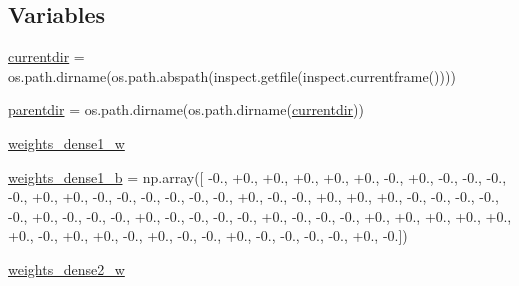 \subsection*{Variables}
\begin{DoxyCompactItemize}
\item 
\hyperlink{namespacepybullet-gym_1_1pybulletgym_1_1examples_1_1roboschool-weights_1_1enjoy___t_f___inverted4815cf8a7bea8454ae92c5ac92dac9b4_a56e49ade808215d29e9f40f047cbbf3e}{currentdir} = os.\+path.\+dirname(os.\+path.\+abspath(inspect.\+getfile(inspect.\+currentframe())))
\item 
\hyperlink{namespacepybullet-gym_1_1pybulletgym_1_1examples_1_1roboschool-weights_1_1enjoy___t_f___inverted4815cf8a7bea8454ae92c5ac92dac9b4_ace85bf3ab97ceff6b21af22abff501fa}{parentdir} = os.\+path.\+dirname(os.\+path.\+dirname(\hyperlink{namespacepybullet-gym_1_1pybulletgym_1_1examples_1_1roboschool-weights_1_1enjoy___t_f___inverted4815cf8a7bea8454ae92c5ac92dac9b4_a56e49ade808215d29e9f40f047cbbf3e}{currentdir}))
\item 
\hyperlink{namespacepybullet-gym_1_1pybulletgym_1_1examples_1_1roboschool-weights_1_1enjoy___t_f___inverted4815cf8a7bea8454ae92c5ac92dac9b4_a2db40f8db227746e1b4c6c9c5ee83680}{weights\+\_\+dense1\+\_\+w}
\item 
\hyperlink{namespacepybullet-gym_1_1pybulletgym_1_1examples_1_1roboschool-weights_1_1enjoy___t_f___inverted4815cf8a7bea8454ae92c5ac92dac9b4_acf896b10467c2c90eaeca8c880d2ea6d}{weights\+\_\+dense1\+\_\+b} = np.\+array(\mbox{[} -\/0., +0., +0., +0., +0., +0., -\/0., +0., -\/0., -\/0., -\/0., -\/0., +0., +0., -\/0., -\/0., -\/0., -\/0., -\/0., -\/0., +0., -\/0., -\/0., +0., +0., +0., -\/0., -\/0., -\/0., -\/0., -\/0., +0., -\/0., -\/0., -\/0., +0., -\/0., -\/0., -\/0., -\/0., +0., -\/0., -\/0., -\/0., +0., +0., +0., +0., +0., +0., -\/0., +0., +0., -\/0., +0., -\/0., -\/0., +0., -\/0., -\/0., -\/0., -\/0., +0., -\/0.\mbox{]})
\item 
\hyperlink{namespacepybullet-gym_1_1pybulletgym_1_1examples_1_1roboschool-weights_1_1enjoy___t_f___inverted4815cf8a7bea8454ae92c5ac92dac9b4_a756b12497728eeeee8495e6bd644d46f}{weights\+\_\+dense2\+\_\+w}
\item 

\end{DoxyCompactItemize}
